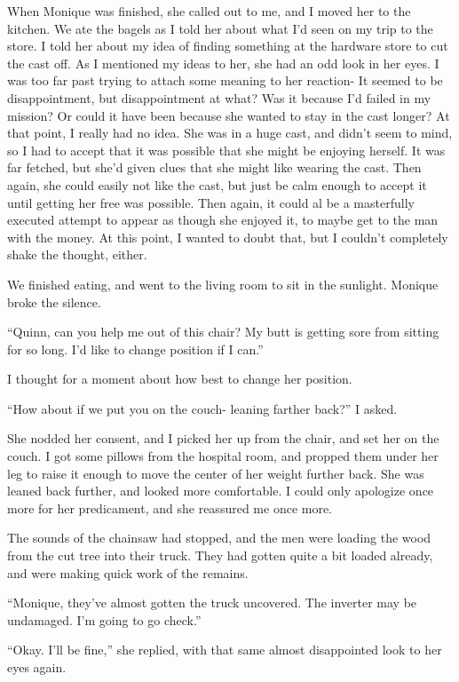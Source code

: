 When Monique was finished, she called out to me, and I moved her to the kitchen. We ate the
bagels as I told her about what I'd seen on my trip to the store. I told her about my idea of
finding something at the hardware store to cut the cast off. As I mentioned my ideas to her, she
had an odd look in her eyes. I was too far past trying to attach some meaning to her reaction-
It seemed to be disappointment, but disappointment at what? Was it because I'd failed in my
mission? Or could it have been because she wanted to stay in the cast longer? At that point, I
really had no idea. She was in a huge cast, and didn't seem to mind, so I had to accept that it
was possible that she might be enjoying herself. It was far fetched, but she'd given clues that
she might like wearing the cast. Then again, she could easily not like the cast, but just be
calm enough to accept it until getting her free was possible. Then again, it could al be a
masterfully executed attempt to appear as though she enjoyed it, to maybe get to the man with
the money. At this point, I wanted to doubt that, but I couldn't completely shake the thought,
either.

We finished eating, and went to the living room to sit in the sunlight. Monique broke the
silence.

``Quinn, can you help me out of this chair? My butt is getting sore from sitting for so
long. I'd like to change position if I can.''

I thought for a moment about how best to change her position.

``How about if we put you on the couch- leaning farther back?'' I asked.

She nodded her consent, and I picked her up from the chair, and set her on the couch. I
got some pillows from the hospital room, and propped them under her leg to raise it enough to
move the center of her weight further back. She was leaned back further, and looked more
comfortable. I could only apologize once more for her predicament, and she reassured me once
more.

The sounds of the chainsaw had stopped, and the men were loading the wood from the cut
tree into their truck. They had gotten quite a bit loaded already, and were making quick work of
the remains.

``Monique, they've almost gotten the truck uncovered. The inverter may be undamaged. I'm
going to go check.''

``Okay. I'll be fine,'' she replied, with that same almost disappointed look to her eyes
again.


